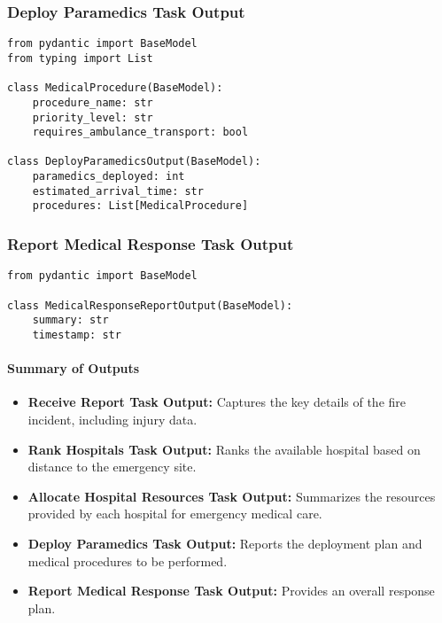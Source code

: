 \subsubsection{Deploy Paramedics Task Output}
\begin{lstlisting}[caption={Pydantic model for Deploy Paramedics Task Output}]
from pydantic import BaseModel
from typing import List

class MedicalProcedure(BaseModel):
    procedure_name: str
    priority_level: str
    requires_ambulance_transport: bool

class DeployParamedicsOutput(BaseModel):
    paramedics_deployed: int
    estimated_arrival_time: str
    procedures: List[MedicalProcedure]
\end{lstlisting}

\subsubsection{Report Medical Response Task Output}
\begin{lstlisting}[caption={Pydantic model for Report Medical Response Task Output}]
from pydantic import BaseModel

class MedicalResponseReportOutput(BaseModel):
    summary: str
    timestamp: str
\end{lstlisting}

\paragraph{Summary of Outputs}
\begin{itemize}
    \item \textbf{Receive Report Task Output:} Captures the key details of the fire incident, including injury data.
    \item \textbf{Rank Hospitals Task Output:} Ranks the available hospital based on distance to the emergency site.
    \item \textbf{Allocate Hospital Resources Task Output:} Summarizes the resources provided by each hospital for emergency medical care.
    \item \textbf{Deploy Paramedics Task Output:} Reports the deployment plan and medical procedures to be performed.
    \item \textbf{Report Medical Response Task Output:} Provides an overall response plan.
\end{itemize}
